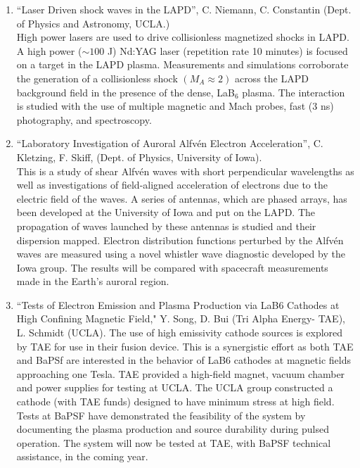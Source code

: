 \documentclass[11pt]{article}
\begin{document}
\begin{enumerate}

\item ``Laser Driven shock waves in the LAPD'', C. Niemann,
  C. Constantin (Dept. of Physics and Astronomy,
  UCLA.)\\ High power lasers are used to drive collisionless
  magnetized shocks in LAPD.  A high power ($\sim 100$ J) Nd:YAG laser (repetition rate 10
  minutes) is focused on a target in the LAPD plasma. Measurements and
  simulations corroborate the generation of a collisionless shock
  $(M_{A}\approx 2)$ across the LAPD background field in the presence
  of the dense, LaB$_{6}$ plasma. The interaction is studied with the
  use of multiple magnetic and Mach probes, fast (3 ns) photography, and
  spectroscopy.

\item ``Laboratory Investigation of Auroral Alfv\'{e}n Electron
  Acceleration'', C. Kletzing, F. Skiff, (Dept. of Physics, University
  of Iowa).\\ This is a study of shear Alfv\'{e}n waves with short
  perpendicular wavelengths as well as investigations of field-aligned
  acceleration of electrons due to the electric field of the waves. A
  series of antennas, which are phased arrays, has been developed at
  the University of Iowa and put on the LAPD. The propagation of waves
  launched by these antennas is studied and their dispersion
  mapped. Electron distribution functions perturbed by the Alfv\'{e}n
  waves are measured using a novel whistler wave diagnostic developed
  by the Iowa group. The results will be compared with spacecraft
  measurements made in the Earth's auroral region.

%
\item ``Tests of Electron Emission and Plasma Production via LaB6 Cathodes at High Confining Magnetic Field,"
Y. Song, D. Bui (Tri Alpha Energy- TAE), L. Schmidt (UCLA).  The use of high emissivity cathode sources is explored by TAE for use in their fusion device.  This is a synergistic effort as both TAE and BaPSf are interested in the behavior of LaB6 cathodes at magnetic fields approaching one Tesla. TAE provided a high-field magnet, vacuum chamber and power supplies for testing at UCLA.  The UCLA group constructed a cathode (with TAE funds) designed to have minimum stress at high field. Tests at BaPSF have demonstrated the feasibility of the system by documenting the plasma production and source durability during pulsed operation. The system will now be tested at TAE, with BaPSF technical assistance, in the coming year.



\end{enumerate}
\end{document}
